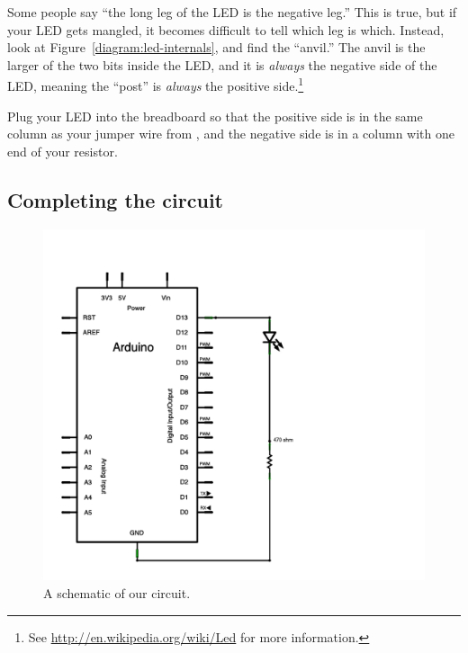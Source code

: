 Some people say ``the long leg of the LED is the negative leg.'' This is true, but if your LED gets mangled, it becomes difficult to tell which leg is which. Instead, look at Figure~\vref{diagram:led-internals}, and find the ``anvil.'' The anvil is the larger of the two bits inside the LED, and it is {\em always} the negative side of the LED, meaning the ``post'' is {\em always} the positive side.\footnote{See \url{http://en.wikipedia.org/wiki/Led} for more information.}

Plug your LED into the breadboard so that the positive side is in the same column as your jumper wire from \chtwopin, and the negative side is in a column with one end	 of your resistor.

\subsection{Completing the circuit}

\begin{figure}
  \begin{center}
    \includegraphics[width=0.9\linewidth]{images/ch2-one-led-circuit-schem}
		\captionsetup{labelformat=empty,justification=centering,font=footnotesize}
    \caption{A schematic of our circuit.}
    \label{diagram:ch2-one-led-circuit-schem}
  \end{center}
\end{figure}

